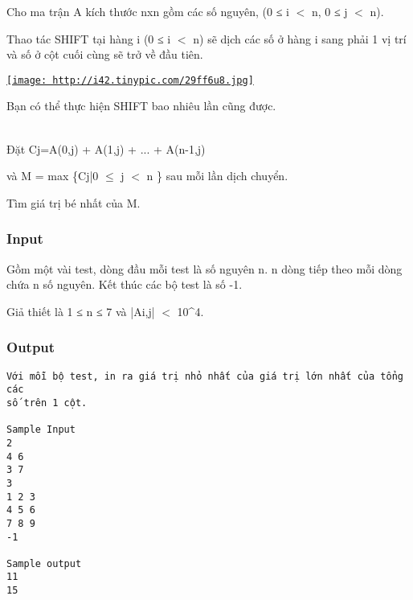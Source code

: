 

Cho ma trận A kích thước nxn gồm các số nguyên, (0 ≤ i $<$ n, 0 ≤ j $<$ n).

Thao tác SHIFT tại hàng i (0 ≤ i $<$ n) sẽ dịch các số ở hàng i sang phải 1 vị trí và số ở cột cuối cùng sẽ trở về đầu tiên.

\href{http://tinypic.com}{
\texttt{[image: http://i42.tinypic.com/29ff6u8.jpg]}}

Bạn có thể thực hiện SHIFT bao nhiêu lần cũng được.


\\Đặt Cj=A(0,j) + A(1,j) + ... + A(n-1,j)

và M = max \{Cj|0 $\le$ j $<$ n \} sau mỗi lần dịch chuyển.

Tìm giá trị bé nhất của M.

\subsubsection{Input}

Gồm một vài test, dòng đầu mỗi test là số nguyên n. n dòng tiếp theo mỗi dòng chứa n số nguyên. Kết thúc các bộ test là số -1.

Giả thiết là 1 ≤ n ≤ 7 và |Ai,j| $<$ 10\textasciicircum4.

\subsubsection{Output}
\begin{verbatim}
Với mỗi bộ test, in ra giá trị nhỏ nhất của giá trị lớn nhất của tổng các
số trên 1 cột.

​Sample Input
2
4 6
3 7
3
1 2 3
4 5 6
7 8 9
-1

Sample output
11
15\end{verbatim}
